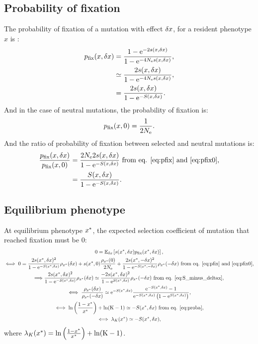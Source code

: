 \documentclass{article}
\begin{document}
\subsection{Probability of fixation}
The probability of fixation of a mutation with effect $\delta x$, for a resident phenotype $x$ is :
\begin{align}
p_{\text{fix}}(x, \delta x) &= \frac{ 1 - \mathrm{e}^{-2 s(x, \delta x)}}{1 - \mathrm{e}^{-4N_{\mathrm{e}} s(x, \delta x)}}, \\
 &\simeq \frac{ 2 s(x, \delta x)}{1 - \mathrm{e}^{-4N_{\mathrm{e}} s(x, \delta x)}}, \\
 &= \frac{ 2 s(x, \delta x)}{1 - \mathrm{e}^{-S(x, \delta x)}}. \label{eq:pfix}
\end{align}
And in the case of neutral mutations, the probability of fixation is:
\begin{gather}
p_{\text{fix}}(x, 0) = \frac{ 1}{2 N_{\mathrm{e}}} \label{eq:pfix0}.
\end{gather}
And the ratio of probability of fixation between selected and neutral mutations is:
\begin{align}
\frac{p_{\text{fix}}(x, \delta x)}{p_{\text{fix}}(x, 0)} & = \frac{ 2 N_{\mathrm{e}} 2 s(x, \delta x)}{1 - \mathrm{e}^{-S(x, \delta x)}} \text{ from eq. \ref{eq:pfix} and \ref{eq:pfix0}},\\
& = \frac{S(x, \delta x)}{1 - \mathrm{e}^{-S(x, \delta x)}} \label{eq:pfixratio}.
\end{align}
\subsection{Equilibrium phenotype}
At equilibrium phenotype $x^{*}$, the expected selection coefficient of mutation that reached fixation must be $0$:
\begin{gather}
 0 = \operatorname{\mathbb{E}}_{\delta x} \left[ s(x^{*}, \delta x) p_{\text{fix}}(x^{*}, \delta x) \right], \\
\iff 0 = \frac{ 2 s(x^{*}, \delta x)^2}{1 - \mathrm{e}^{-S(x^{*}, \delta x)}}   \rho_{x^{*}}(\delta x) + s(x^{*}, 0) \frac{ \rho_{x^{*}}(0)}{2N_{\mathrm{e}}} + \frac{ 2s(x^{*}, -\delta x)^2}{1 - \mathrm{e}^{-S(x^{*}, -\delta x)}} \rho_{x^{*}}(-\delta x)\text{ from eq. \ref{eq:pfix} and \ref{eq:pfix0}}, \\
\Longrightarrow \frac{ 2s(x^{*}, \delta x)^2}{1 - \mathrm{e}^{-S(x^{*}, \delta x)}}   \rho_{x^{*}}(\delta x) \simeq \frac{ - 2s(x^{*}, \delta x)^2}{1 - \mathrm{e}^{S(x^{*}, \delta x)}}   \rho_{x^{*}}(-\delta x) \text{ from eq. \ref{eq:S_minus_deltax}}, \\
\iff \frac{ \rho_{x^{*}}(\delta x)}{\rho_{x^{*}}(-\delta x)} \simeq \mathrm{e}^{-S(x^{*}, \delta x)} \frac{ \mathrm{e}^{-S(x^{*}, \delta x)} - 1}{ \mathrm{e}^{-S(x^{*}, \delta x)} \left( 1 - \mathrm{e}^{S(x^{*}, \delta x)} \right)}, \\
\iff \ln \left( \frac{1 - x^{*}}{x^{*}} \right) + \ln (\text{K}-1) \simeq -S(x^{*}, \delta x) \text{ from eq. \ref{eq:proba}} \label{eq:equilibrium}, \\
\iff \lambda_{K}(x^{*}) \simeq -S(x^{*}, \delta x) \label{eq:equilibrium_lambda},
\end{gather}
where  $\lambda_{K}(x^{*}) = \ln \left( \frac{1 - x^{*}}{x^{*}} \right) + \ln (\text{K}-1)$.
\end{document}
